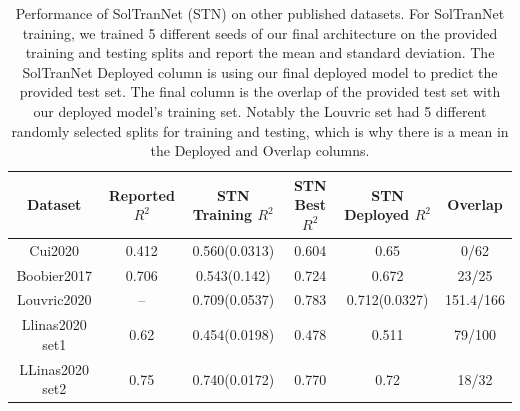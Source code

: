 \documentclass[journal=jcisd8,manuscript=article]{achemso}
\begin{document}
\begin{table}
    \begin{tabular}{|c|c|c|c|c|c|}
        \hline
         Dataset & Reported $R^2$ & STN Training $R^2$ &  STN Best $R^2$ & STN Deployed $R^2$ & Overlap \\
        \hline
         Cui2020 & 0.412 & 0.560(0.0313) & 0.604 &  0.65 & 0/62 \\
        Boobier2017 & 0.706 &  0.543(0.142) & 0.724 &  0.672 & 23/25 \\
        Louvric2020 &  -- & 0.709(0.0537) & 0.783 & 0.712(0.0327) & 151.4/166 \\
        Llinas2020 set1 & 0.62 & 0.454(0.0198) &  0.478 & 0.511 & 79/100 \\
        LLinas2020 set2 & 0.75 & 0.740(0.0172) & 0.770 & 0.72 & 18/32 \\
        \hline
    \end{tabular}
    \caption{Performance of SolTranNet (STN) on other published datasets. For SolTranNet training, we trained 5 different seeds of our final architecture on the provided training and testing splits and report the mean and standard deviation. The SolTranNet Deployed column is using our final deployed model to predict the provided test set. The final column is the overlap of the provided test set with our deployed model's training set. Notably the Louvric set had 5 different randomly selected splits for training and testing, which is why there is a mean in the Deployed and Overlap columns.}
    \label{tab:othersetsr2}
\end{table}
\end{document}
